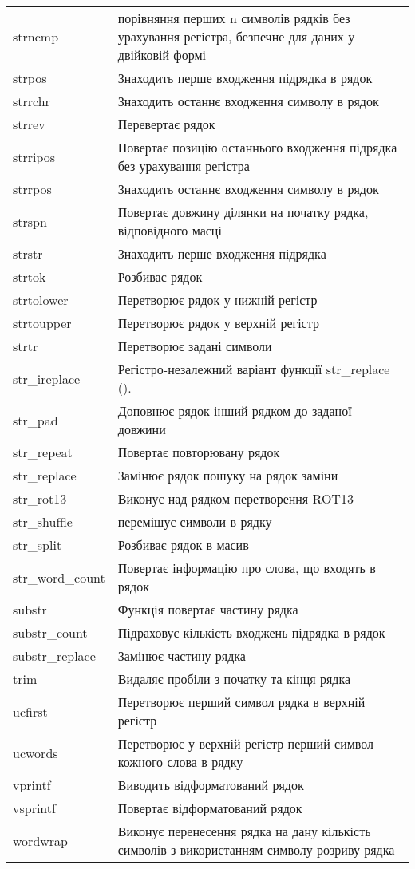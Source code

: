 \begin{longtable}[t]{|l|p{21em}|}
strncmp & порівняння перших n символів рядків без урахування регістра, безпечне для даних у двійковій формі \\
strpos & Знаходить перше входження підрядка в рядок \\
strrchr & Знаходить останнє входження символу в рядок \\
strrev & Перевертає рядок \\
strripos & Повертає позицію останнього входження підрядка без урахування регістра \\
strrpos & Знаходить останнє входження символу в рядок \\
strspn & Повертає довжину ділянки на початку рядка, відповідного масці \\
strstr & Знаходить перше входження підрядка \\
strtok & Розбиває рядок \\
strtolower & Перетворює рядок у нижній регістр \\
strtoupper & Перетворює рядок у верхній регістр \\
strtr & Перетворює задані символи \\
str\_ireplace & Регістро-незалежний варіант функції str\_replace (). \\
str\_pad & Доповнює рядок інший рядком до заданої довжини \\
str\_repeat & Повертає повторювану рядок \\
str\_replace & Замінює рядок пошуку на рядок заміни \\
str\_rot13 & Виконує над рядком перетворення ROT13 \\
str\_shuffle & перемішує символи в рядку \\
str\_split & Розбиває рядок в масив \\
str\_word\_count & Повертає інформацію про слова, що входять в рядок \\
substr & Функція повертає частину рядка \\
substr\_count & Підраховує кількість входжень підрядка в рядок \\
substr\_replace & Замінює частину рядка \\
trim & Видаляє пробіли з початку та кінця рядка \\
ucfirst & Перетворює перший символ рядка в верхній регістр \\
ucwords & Перетворює у верхній регістр перший символ кожного слова в рядку \\
vprintf & Виводить відформатований рядок \\
vsprintf & Повертає відформатований рядок \\
wordwrap & Виконує перенесення рядка на дану кількість символів з використанням символу розриву рядка \\
\hline
\end{longtable}

